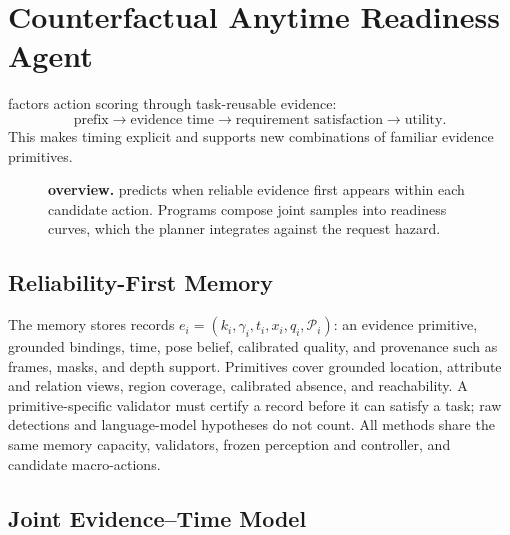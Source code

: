 \section{Counterfactual Anytime Readiness Agent}
\label{sec:method}

\method{} factors action scoring through task-reusable evidence:
\begin{equation}
\label{eq:factorization}
\text{prefix}\rightarrow\text{evidence time}
\rightarrow\text{requirement satisfaction}\rightarrow\text{utility}.
\end{equation}
This makes timing explicit and supports new combinations of familiar evidence primitives.

\begin{figure}[t]
  \centering
  \caption{\textbf{\method{} overview.}
  \jet{} predicts when reliable evidence first appears within each candidate action.
  Programs compose joint samples into readiness curves, which the planner integrates against the request hazard.}
  \label{fig:method}
\end{figure}

\subsection{Reliability-First Memory}

The memory \rfm{} stores records
$e_i=(k_i,\gamma_i,t_i,x_i,q_i,\mathcal{P}_i)$:
an evidence primitive, grounded bindings, time, pose belief, calibrated quality, and provenance such as frames, masks, and depth support.
Primitives cover grounded location, attribute and relation views, region coverage, calibrated absence, and reachability.
A primitive-specific validator must certify a record before it can satisfy a task; raw detections and language-model hypotheses do not count.
All methods share the same memory capacity, validators, frozen perception and controller, and candidate macro-actions.

\subsection{Joint Evidence--Time Model}

